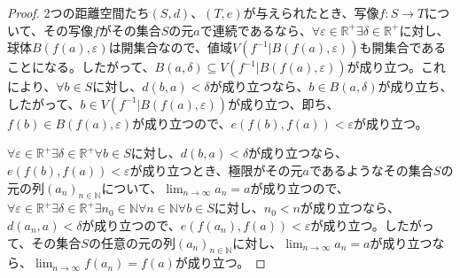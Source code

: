 \documentclass[dvipdfmx]{jsarticle}
\begin{document}
\begin{proof}
2つの距離空間たち$(S,d)$、$(T,e)$が与えられたとき、写像$f:S \rightarrow T$について、その写像$f$がその集合$S$の元$a$で連続であるなら、$\forall\varepsilon \in \mathbb{R}^{+}\exists\delta \in \mathbb{R}^{+}$に対し、球体$B\left( f(a),\varepsilon \right)$は開集合なので、値域$V\left( f^{- 1}|B\left( f(a),\varepsilon \right) \right)$も開集合であることになる。したがって、$B(a,\delta) \subseteq V\left( f^{- 1}|B\left( f(a),\varepsilon \right) \right)$が成り立つ。これにより、$\forall b \in S$に対し、$d(b,a) < \delta$が成り立つなら、$b \in B(a,\delta)$が成り立ち、したがって、$b \in V\left( f^{- 1}|B\left( f(a),\varepsilon \right) \right)$が成り立つ、即ち、$f(b) \in B\left( f(a),\varepsilon \right)$が成り立つので、$e\left( f(b),f(a) \right) < \varepsilon$が成り立つ。\par
$\forall\varepsilon \in \mathbb{R}^{+}\exists\delta \in \mathbb{R}^{+}\forall b \in S$に対し、$d(b,a) < \delta$が成り立つなら、$e\left( f(b),f(a) \right) < \varepsilon$が成り立つとき、極限がその元$a$であるようなその集合$S$の元の列$\left( a_{n} \right)_{n \in \mathbb{N}}$について、$\lim_{n \rightarrow \infty}a_{n} = a$が成り立つので、$\forall\varepsilon \in \mathbb{R}^{+}\exists\delta \in \mathbb{R}^{+}\exists n_{0} \in \mathbb{N}\forall n \in \mathbb{N}\forall b \in S$に対し、$n_{0} < n$が成り立つなら、$d\left( a_{n},a \right) < \delta$が成り立つので、$e\left( f\left( a_{n} \right),f(a) \right) < \varepsilon$が成り立つ。したがって、その集合$S$の任意の元の列$\left( a_{n} \right)_{n \in \mathbb{N}}$に対し、$\lim_{n \rightarrow \infty}a_{n} = a$が成り立つなら、$\lim_{n \rightarrow \infty}{f\left( a_{n} \right)} = f(a)$が成り立つ。\par

\end{proof}
\end{document}
